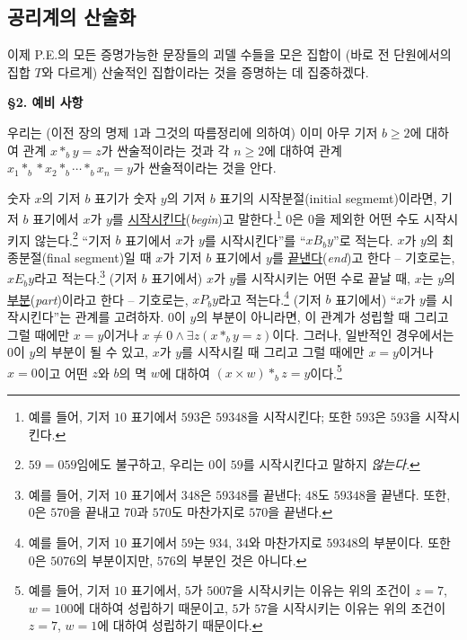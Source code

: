 \documentclass[12pt]{paper}
\begin{document}
  \subsection{공리계의 산술화}
  \hspace{12pt}

  이제 P.E.의 모든 증명가능한 문장들의 괴델 수들을 모은 집합이 (바로 전 단원에서의 집합 $T$와 다르게) 산술적인 집합이라는 것을 증명하는 데 집중하겠다.

  \noindent \textbf{\S2. 예비 사항}

  우리는 (이전 장의 명제 1과 그것의 따름정리에 의하여)
  이미 아무 기저 $ b \ge 2 $에 대하여 관계 $ x *_{b} y = z $가 싼술적이라는 것과
  각 $n \ge 2$에 대하여 관계 $ x_1 *_{b} * x_2 *_{b} \cdots *_{b} x_n = y $가 싼술적이라는 것을 안다.

  숫자 $x$의 기저 $b$ 표기가 숫자 $y$의 기저 $b$ 표기의 시작분절(initial segmemt)이라면,
  기저 $b$ 표기에서 $x$가 $y$를 \underline{시작시킨다}(\textit{begin})고 말한다.\footnote
  {
    예를 들어, 기저 $10$ 표기에서 $593$은 $59348$을 시작시킨다; 또한 $593$은 $593$을 시작시킨다.
  }
  $0$은 $0$을 제외한 어떤 수도 시작시키지 않는다.\footnote
  {
    $59 = 059$임에도 불구하고, 우리는 $0$이 $59$를 시작시킨다고 말하지 \textit{않는다}.
  }
  ``기저 $b$ 표기에서 $x$가 $y$를 시작시킨다''를 ``$x B_{b} y$''로 적는다.
  $x$가 $y$의 최종분절(final segment)일 때 $x$가 기저 $b$ 표기에서 $y$를 \underline{끝낸다}(\textit{end})고 한다 -- 기호로는, $x E_{b} y$라고 적는다.\footnote
  {
    예를 들어, 기저 $10$ 표기에서 $348$은 $59348$를 끝낸다; $48$도 $59348$을 끝낸다.
    또한, $0$은 $570$을 끝내고 $70$과 $570$도 마찬가지로 $570$을 끝낸다.
  }
  (기저 $b$ 표기에서) $x$가 $y$를 시작시키는 어떤 수로 끝날 때, $x$는 $y$의 \underline{부분}(\textit{part})이라고 한다 -- 기호로는, $x P_{b} y$라고 적는다.\footnote
  {
    예를 들어, 기저 $10$ 표기에서 $59$는 $934$, $34$와 마찬가지로 $59348$의 부분이다.
    또한 $0$은 $5076$의 부분이지만, $576$의 부분인 것은 아니다.
  }
  (기저 $b$ 표기에서) ``$x$가 $y$를 시작시킨다''는 관계를 고려하자.
  $0$이 $y$의 부분이 아니라면, 이 관계가 성립할 때 그리고 그럴 때에만 $x = y$이거나 $x \ne 0 \land \exists z \left( x *_{b} y = z \right)$이다.
  그러나, 일반적인 경우에서는 $0$이 $y$의 부분이 될 수 있고, $x$가 $y$를 시작시킬 때 그리고 그럴 때에만 $x = y$이거나 $x = 0$이고 어떤 $z$와 $b$의 멱 $w$에 대하여 $\left( x \times w \right) *_{b} z = y$이다.\footnote
  {
    예를 들어, 기저 $10$ 표기에서, $5$가 $5007$을 시작시키는 이유는 위의 조건이 $z = 7$, $w = 100$에 대하여 성립하기 때문이고,
    $5$가 $57$을 시작시키는 이유는 위의 조건이 $z = 7$, $w = 1$에 대하여 성립하기 때문이다.
  }
\end{document}
